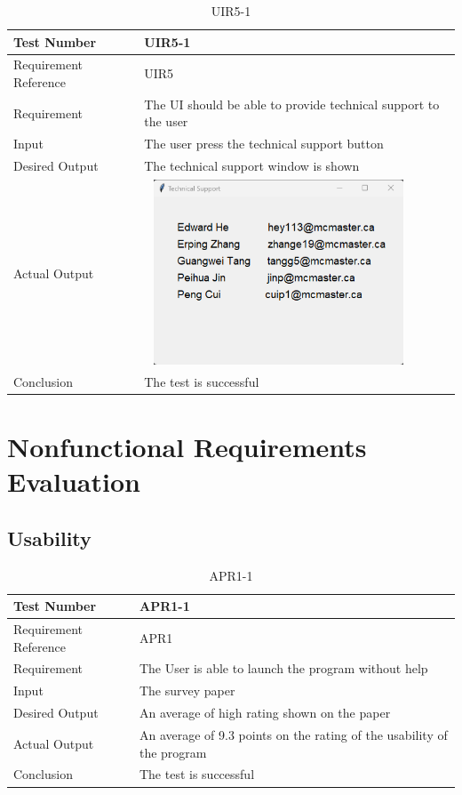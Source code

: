 \documentclass[12pt, titlepage]{article}
\begin{document}
\begin{table}[H]
\begin{center}
\begin{tabular}{|l | m{9cm}|}
\hline
  Test Number & UIR5-1\\
  \hline
  Requirement Reference & UIR5\\
  \hline
  Requirement & The UI should be able to provide  technical support to the user\\
  \hline
  Input & The user press the technical support button\\
  \hline
  Desired Output & The technical support window is shown\\
  \hline
  Actual Output & \includegraphics[width=80mm, height=55mm]{UIR51.png}\\
  \hline
  Conclusion & The test is successful\\
  \hline
\end{tabular}
\end{center}   
\caption{UIR5-1}
\end{table}

\section{Nonfunctional Requirements Evaluation}

\subsection{Usability}

\begin{table}[H]
\begin{center}
\begin{tabular}{|l | m{9cm}|}
\hline
  Test Number & APR1-1\\
  \hline
  Requirement Reference & APR1\\
  \hline
  Requirement & The User is able to launch the program without help\\
  \hline
  Input & The survey paper\\
  \hline
  Desired Output & An average of high rating shown on the paper\\
  \hline
  Actual Output & An average of 9.3 points on the rating of the usability of the program\\
  \hline
  Conclusion & The test is successful\\
  \hline
\end{tabular}
\end{center}   
\caption{APR1-1}
\end{table}
\end{document}
